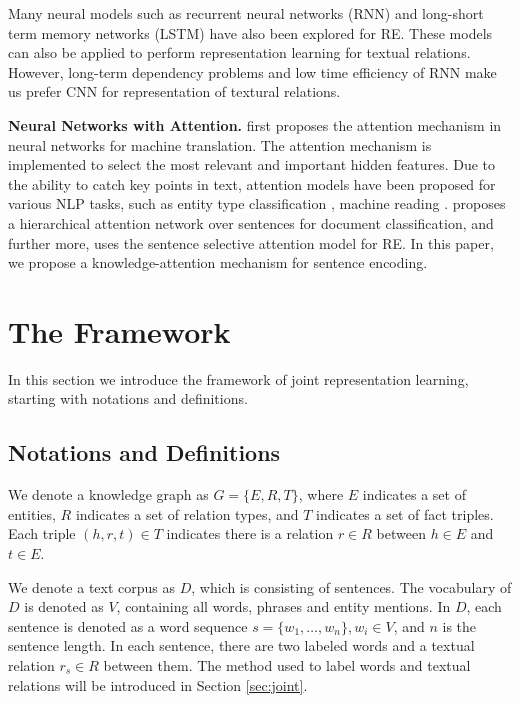 \documentclass[11pt,a4paper]{article}
\begin{document}
Many neural models such as recurrent neural networks (RNN) \cite{zhang2015relation} and long-short term memory networks (LSTM) \cite{xu2015classifying,miwa2016end} have also been explored for RE. These models can also be applied to perform representation learning for textual relations. However, long-term dependency problems and low time efficiency of RNN make us prefer CNN for representation of textural relations.

\textbf{Neural Networks with Attention.} \cite{bahdanau2014neural} first proposes the attention mechanism in neural networks for machine translation. The attention mechanism is implemented to select the most relevant and important hidden features. Due to the ability to catch key points in text, attention models have been proposed for various NLP tasks, such as entity type classification \cite{shimaoka2016attentive}, machine reading \cite{hermann2015teaching,dhingra2016gated,sordoni2016iterative}. \cite{yang2016hierarchical} proposes a hierarchical attention network over sentences for document classification, and further more, \cite{lin2016neural} uses the sentence selective attention model for RE. In this paper, we propose a knowledge-attention mechanism for sentence encoding.

\section{The Framework}
In this section we introduce the framework of joint representation learning, starting with notations and definitions.

\subsection{Notations and Definitions}

We denote a knowledge graph as $G = \{E, R, T\}$, where $E$ indicates a set of entities, $R$ indicates a set of relation types, and $T$ indicates a set of fact triples. Each triple $(h, r, t) \in T$ indicates there is a relation $r \in R$ between $h \in E$ and $t \in E$.

We denote a text corpus as $D$, which is consisting of sentences. The vocabulary of $D$ is denoted as $V$, containing all words, phrases and entity mentions. In $D$, each sentence is denoted as a word sequence $s = \{w_1, \ldots, w_n\}, w_i \in V$, and $n$ is the sentence length. In each sentence, there are two labeled words and a textual relation $r_s \in R$ between them. The method used to label words and textual relations will be introduced in Section \ref{sec:joint}. 
\end{document}
